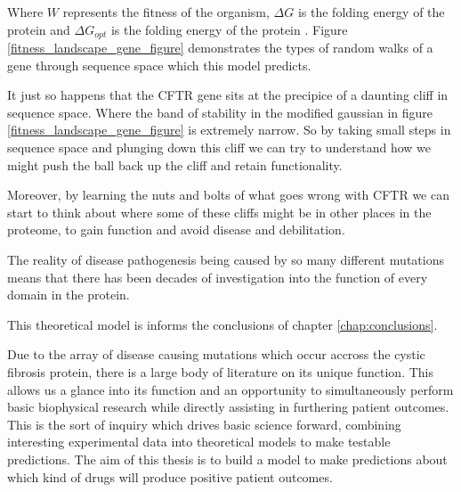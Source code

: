 Where $W$ represents the fitness of the organism, $\Delta G$ is the folding energy of the protein and $\Delta G_{opt}$ is the folding energy of the protein . Figure \ref{fitness_landscape_gene_figure} demonstrates the types of random walks of a gene through sequence space which this model predicts. 

It just so happens that the CFTR gene sits at the precipice of a daunting cliff in sequence space. Where the band of stability in the modified gaussian in figure \ref{fitness_landscape_gene_figure} is extremely narrow. So by taking small steps in sequence space and plunging down this cliff we can try to understand how we might push the ball back up the cliff and retain functionality.

Moreover, by learning the nuts and bolts of what goes wrong with CFTR we can start to think about where some of these cliffs might be in other places in the proteome, to gain function and avoid disease and debilitation.

The reality of disease pathogenesis being caused by so many different mutations means that there has been decades of investigation into the function of every domain in the protein. 

This theoretical model is informs the conclusions of chapter \ref{chap:conclusions}.

Due to the array of disease causing mutations which occur accross the cystic fibrosis protein, there is a large body of literature on its unique function. This allows us a glance into its function and an opportunity to simultaneously perform basic biophysical research while directly assisting in furthering patient outcomes. This is the sort of inquiry which drives basic science forward, combining interesting experimental data into theoretical models to make testable predictions. The aim of this thesis is to build a model to make predictions about which kind of drugs will produce positive patient outcomes.

